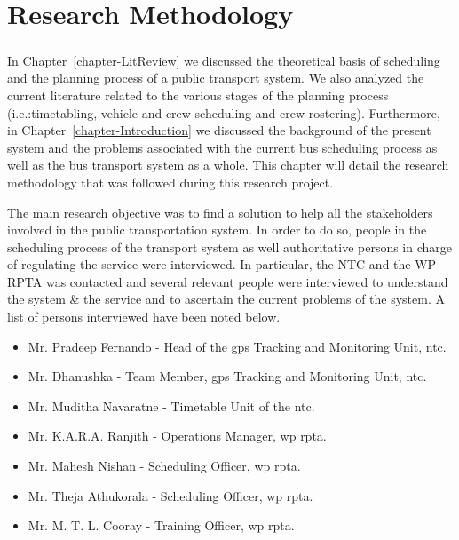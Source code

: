 
\chapter{Research Methodology}
\label{chapter-ResearchMethodology}

\paragraph{ } In Chapter~\ref{chapter-LitReview} we discussed the theoretical basis of scheduling and the planning process of a public transport system. We also analyzed the current literature related to the various stages of the planning process (i.e.:timetabling, vehicle and crew scheduling and crew rostering). Furthermore, in Chapter~\ref{chapter-Introduction} we discussed the background of the present system and the problems associated with the current bus scheduling process as well as the bus transport system as a whole. This chapter will detail the research methodology that was followed during this research project.

The main research objective was to find a solution to help all the stakeholders involved in the public transportation system. In order to do so, people in the scheduling process of the transport system as well authoritative persons in charge of regulating the service were interviewed. In particular, the NTC and the WP RPTA was contacted and several relevant people were interviewed to understand the system \& the service and to ascertain the current problems of the system. A list of persons interviewed have been noted below.

\begin{itemize}
\item Mr. Pradeep Fernando - Head of the \acrshort{gps} Tracking and Monitoring Unit, \acrshort{ntc}.
\item Mr. Dhanushka - Team Member, \acrshort{gps} Tracking and Monitoring Unit, \acrshort{ntc}.
\item Mr. Muditha Navaratne - Timetable Unit of the \acrshort{ntc}.
\item Mr. K.A.R.A. Ranjith - Operations Manager, \acrshort{wp} \acrshort{rpta}.
\item Mr. Mahesh Nishan - Scheduling Officer, \acrshort{wp} \acrshort{rpta}.
\item Mr. Theja Athukorala - Scheduling Officer, \acrshort{wp} \acrshort{rpta}.
\item Mr. M. T. L. Cooray - Training Officer, \acrshort{wp} \acrshort{rpta}.
\end{itemize}

